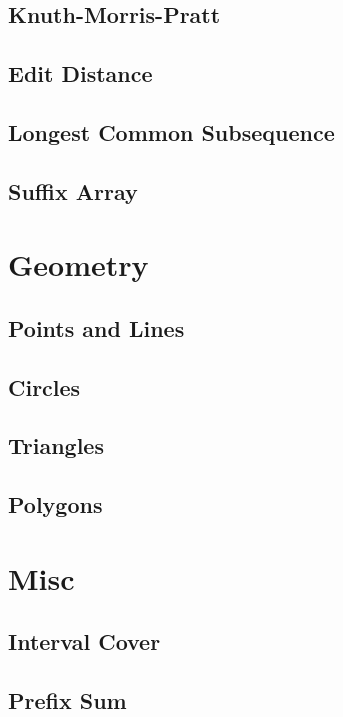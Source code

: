 \documentclass[a4paper,landscape,8pt]{article}
\begin{document}
\begin{multicols}{2}
\subsection{Knuth-Morris-Pratt}


\subsection{Edit Distance}


\subsection{Longest Common Subsequence}


\subsection{Suffix Array}



\section{Geometry}

\subsection{Points and Lines}


\subsection{Circles}


\subsection{Triangles}


\subsection{Polygons}



\section{Misc}

\subsection{Interval Cover}


\subsection{Prefix Sum}



\end{multicols}
\end{document}
